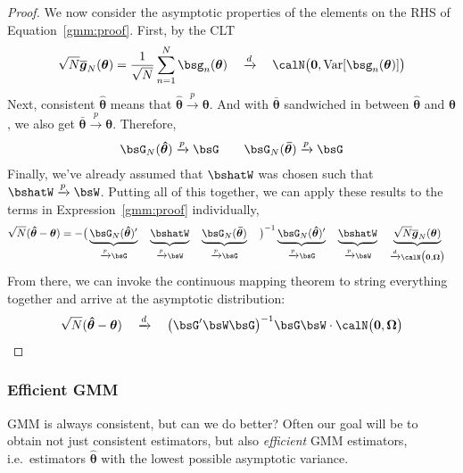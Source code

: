 \documentclass[12pt]{article}
\theoremstyle{plain}
\theoremstyle{definition}
\theoremstyle{remark}
\newcommand{\bstheta}{\boldsymbol{\theta}}
\newcommand{\bsOmega}{\boldsymbol{\Omega}}
\newcommand{\bshattheta}{\boldsymbol{\hat{\theta}}}
\newcommand{\bsbartheta}{\boldsymbol{\bar{\theta}}}
\newcommand{\bsbarg}{\boldsymbol{\overline{g}}}
\renewcommand{\bso}{\boldsymbol{0}}
\newcommand{\Var}{\operatorname{Var}}
\newcommand{\pto}{\xrightarrow{p}}
\newcommand{\dto}{\xrightarrow{d}}
\newcommand{\sumnN}{\sum^N_{n=1}}
\begin{document}
\begin{proof}
We now consider the asymptotic properties of the elements on the RHS of
Equation~\ref{gmm:proof}. First, by the CLT
\begin{align*}
  \sqrt{N}
  \bsbarg_N(\bstheta)
  =
  \frac{1}{\sqrt{N}}
  \sumnN
  \bsg_n(\bstheta)
  \quad\dto\quad
  \calN\big(\bso,\Var[\bsg_n(\bstheta)]\big)
\end{align*}
Next, consistent $\bshattheta$ means that $\bshattheta\pto\bstheta$. And
with $\bsbartheta$ sandwiched in between $\bshattheta$ and $\bstheta$,
we also get $\bsbartheta\pto\bstheta$. Therefore,
\begin{align*}
  \bsG_N(\bshattheta)
  \pto \bsG
  \qquad
  \bsG_N(\bsbartheta)
  \pto \bsG
\end{align*}
Finally, we've already assumed that $\bshatW$ was chosen such that
$\bshatW\pto \bsW$. Putting all of this together, we can apply these
results to the terms in Expression~\ref{gmm:proof} individually,
\begin{align*}
  \sqrt{N}(\bshattheta-\bstheta)
  &=
  -
  \big(
  \underbrace{%
    \bsG_N(\bshattheta)'
  }_{%
    \pto \bsG
  }
  \quad
  \underbrace{%
    \bshatW
    \vphantom{\bsG(\bshattheta)'}
  }_{%
    \pto\bsW
  }
  \quad
  \underbrace{%
    \bsG_N(\bsbartheta)
  }_{%
    \pto \bsG
    \vphantom{\bsG(\bshattheta)'}
  }
  \quad
  \big)^{-1}
  \underbrace{%
    \bsG_N(\bshattheta)'
  }_{%
    \pto \bsG
    \vphantom{\bsG(\bshattheta)'}
  }
  \quad
  \underbrace{%
    \bshatW
    \vphantom{\bsG(\bshattheta)'}
  }_{%
    \pto\bsW
  }
  \quad
  \underbrace{%
  \sqrt{N}
  \bsbarg_N(\bstheta)
  }_{\dto\calN\big(\bso,\bsOmega\big)}
\end{align*}
From there, we can invoke the continuous mapping theorem to string
everything together and arrive at the asymptotic distribution:
\begin{align*}
  \sqrt{N}(\bshattheta-\bstheta)
  \quad\dto\quad
  \big( \bsG' \bsW \bsG\big)^{-1}
  \bsG \bsW
  \cdot
  \calN\big(\bso,\bsOmega\big)
\end{align*}
\end{proof}


\clearpage
\subsubsection{Efficient GMM}

GMM is always consistent, but can we do better?
Often our goal will be to obtain not just consistent estimators, but
also \emph{efficient} GMM estimators, i.e.\ estimators $\bshattheta$
with the lowest possible asymptotic variance.
\end{document}
